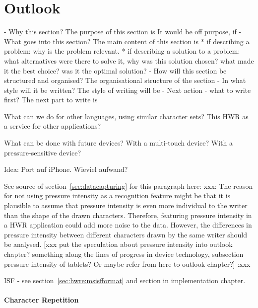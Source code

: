 
\chapter{Outlook}

- Why this section? 
  The purpose of this section is 
  It would be off purpose, if 
- What goes into this section?
  The main content of this section is 
  * if describing a problem: why is the problem relevant.
  * if describing a solution to a problem: what alternatives were
    there to solve it, why was this solution chosen? 
    what made it the best choice? was it the optimal solution?
- How will this section be structured and organised?
  The organisational structure of the section 
- In what style will it be written?
  The style of writing will be 
- Next action - what to write first?
  The next part to write is

What can we do for other languages, using similar character sets?
This HWR as a service for other applications?

What can be done with future devices?
With a multi-touch device?
With a pressure-sensitive device?

Idea: Port auf iPhone. Wieviel aufwand?

See source of section~\ref{sec:datacapturing} for this paragraph here:
xxx: 
The reason for not using pressure intensity as a recognition feature might be 
that it is plausible to assume that pressure intensity is even more individual 
to the writer than the shape of the drawn characters. 
Therefore, featuring pressure intensity in a HWR application could add more 
noise to the data. However, the differences in pressure intensity 
between different characters drawn by the same writer should be analysed.
[xxx put the speculation about pressure intensity into outlook chapter? 
something along the lines of progress in device technology, 
subsection pressure intensity of tablets? Or maybe refer from here to
outlook chapter?] 
:xxx


ISF - see section~\ref{sec:hwre:msisfformat} and section in 
implementation chapter.



\subsubsection{Character Repetition}
\label{sec:concept:characterrepetition} %


